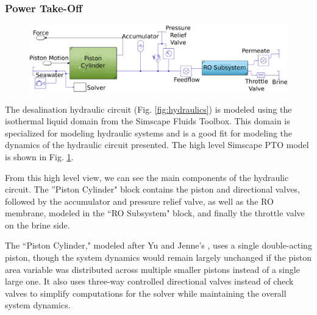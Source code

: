\documentclass[twocolumn,10pt]{asme2e}
\begin{document}

\subsubsection{Power Take-Off}

\begin{figure}  %
    \centering
    \includegraphics[width=0.7\linewidth]{../figs/simscape_hydraulics.pdf}
    \label{fig:hydraulic_simscape}
\end{figure}

The desalination hydraulic circuit (Fig. \ref{fig:hydraulics}) is modeled using the isothermal liquid domain from the Simscape Fluids Toolbox. This domain is specialized for modeling hydraulic systems and is a good fit for modeling the dynamics of the hydraulic circuit presented. The high level Simscape PTO model is shown in Fig. \ref{fig:hydraulic_simscape}.

From this high level view, we can see the main components of the hydraulic circuit. The ''Piston Cylinder" block contains the piston and directional valves, followed by the accumulator and pressure relief valve, as well as the RO membrane, modeled in the ``RO Subsystem" block, and finally the throttle valve on the brine side.

The ``Piston Cylinder," modeled after Yu and Jenne's \cite{Yu2018}, uses a single double-acting piston, though the system dynamics would remain largely unchanged if the piston area variable was distributed across multiple smaller pistons instead of a single large one. It also uses three-way controlled directional valves instead of check valves to simplify computations for the solver while maintaining the overall system dynamics.

\end{document}
